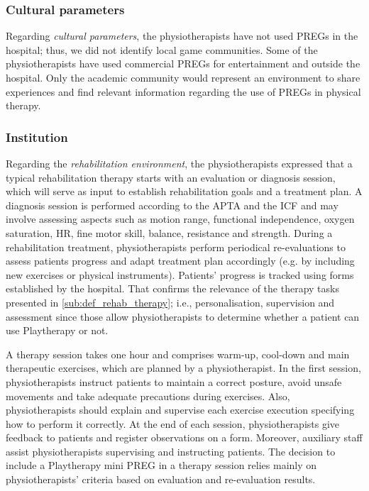 \subsubsection{Cultural parameters}
Regarding \emph{cultural parameters}, the physiotherapists have not used \acp{PREG} in the hospital; thus, we did not identify local game communities. Some of the physiotherapists have used commercial \acp{PREG} for entertainment and outside the hospital. Only the academic community would represent an environment to share experiences and find relevant information regarding the use of \acp{PREG} in physical therapy. 

\subsubsection{Institution}
Regarding the \emph{rehabilitation environment}, the physiotherapists expressed that a typical rehabilitation therapy starts with an evaluation or diagnosis session, which will serve as input to establish rehabilitation goals and a treatment plan. A diagnosis session is performed according to the \ac{APTA} and the \ac{ICF} and may involve assessing aspects such as motion range, functional independence, oxygen saturation, \ac{HR}, fine motor skill, balance, resistance and strength. During a rehabilitation treatment, physiotherapists perform periodical re-evaluations to assess patients progress and adapt treatment plan accordingly (e.g. by including new exercises or physical instruments). Patients' progress is tracked using forms established by the hospital. That confirms the relevance of the therapy tasks presented in \autoref{sub:def_rehab_therapy}; i.e., personalisation, supervision and assessment since those allow physiotherapists to determine whether a patient can use Playtherapy or not.

A therapy session takes one hour and comprises warm-up, cool-down and main therapeutic exercises, which are planned by a physiotherapist. In the first session, physiotherapists instruct patients to maintain a correct posture, avoid unsafe movements and take adequate precautions during exercises. Also, physiotherapists should explain and supervise each exercise execution specifying how to perform it correctly. At the end of each session, physiotherapists give feedback to patients and register observations on a form. Moreover, auxiliary staff assist physiotherapists supervising and instructing patients. The decision to include a Playtherapy mini \ac{PREG} in a therapy session relies mainly on physiotherapists' criteria based on evaluation and re-evaluation results.

